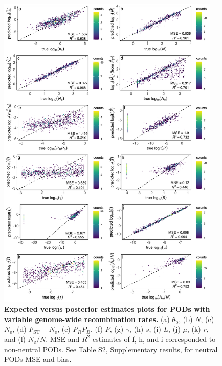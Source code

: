 \documentclass[a4paper, 12pt]{article}
\begin{document}
\begin{figure}[ht]
  \centering
  \includegraphics[width=0.95\textwidth]{Figures/FigureS5_posterior_plots_recombination.pdf}
  \small\caption{\textbf{Expected versus posterior estimates plots for PODs with variable genome-wide recombination rates.} (a) $\theta_{\mathrm{b}}$, (b) $N$, (c) $N_{\mathrm{e}}$, (d) $F_{\mathrm{ST}}-N_{\mathrm{e}}$, (e) $P_RP_B$, (f) $P$, (g) $\gamma$, (h) $\bar{s}$, (i) $L$, (j) $\mu$, (k) $r$, and (l) $N_{\mathrm{e}}/N$. MSE and $R^2$ estimates of f, h, and i corresponded to non-neutral PODs. See Table S2, Supplementary results, for neutral PODs MSE and bias.}
  \label{fig:supple_pods_variable_recomb}
\end{figure}
\end{document}
